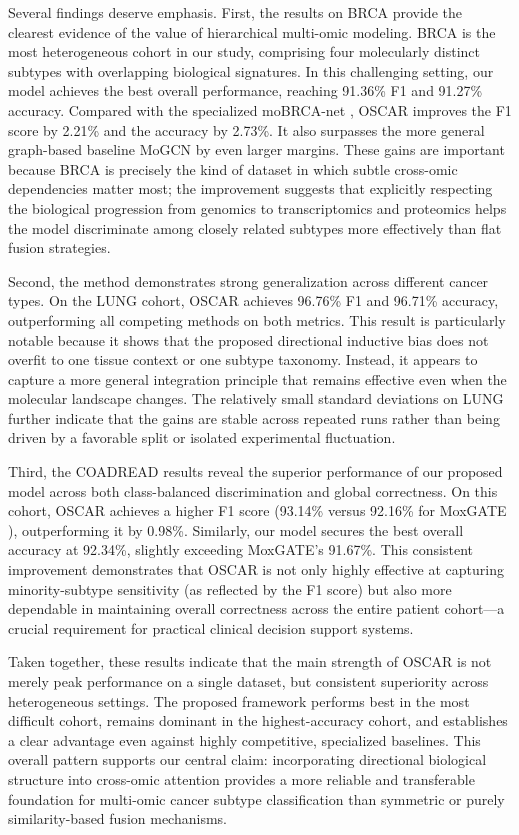 \documentclass[lettersize,journal]{IEEEtran}
\begin{document}
Several findings deserve emphasis. First, the results on BRCA provide the clearest evidence of the value of hierarchical multi-omic modeling. BRCA is the most heterogeneous cohort in our study, comprising four molecularly distinct subtypes with overlapping biological signatures. In this challenging setting, our model achieves the best overall performance, reaching 91.36\% F1 and 91.27\% accuracy. Compared with the specialized moBRCA-net \cite{moBRCAnat2023}, OSCAR improves the F1 score by 2.21\% and the accuracy by 2.73\%. It also surpasses the more general graph-based baseline MoGCN \cite{MoGCN2022} by even larger margins. These gains are important because BRCA is precisely the kind of dataset in which subtle cross-omic dependencies matter most; the improvement suggests that explicitly respecting the biological progression from genomics to transcriptomics and proteomics helps the model discriminate among closely related subtypes more effectively than flat fusion strategies.

Second, the method demonstrates strong generalization across different cancer types. On the LUNG cohort, OSCAR achieves 96.76\% F1 and 96.71\% accuracy, outperforming all competing methods on both metrics. This result is particularly notable because it shows that the proposed directional inductive bias does not overfit to one tissue context or one subtype taxonomy. Instead, it appears to capture a more general integration principle that remains effective even when the molecular landscape changes. The relatively small standard deviations on LUNG further indicate that the gains are stable across repeated runs rather than being driven by a favorable split or isolated experimental fluctuation.

Third, the COADREAD results reveal the superior performance of our proposed model across both class-balanced discrimination and global correctness. On this cohort, OSCAR achieves a higher F1 score (93.14\% versus 92.16\% for MoxGATE \cite{MoxGATE2023}), outperforming it by 0.98\%. Similarly, our model secures the best overall accuracy at 92.34\%, slightly exceeding MoxGATE's 91.67\%. This consistent improvement demonstrates that OSCAR is not only highly effective at capturing minority-subtype sensitivity (as reflected by the F1 score) but also more dependable in maintaining overall correctness across the entire patient cohort—a crucial requirement for practical clinical decision support systems.

Taken together, these results indicate that the main strength of OSCAR is not merely peak performance on a single dataset, but consistent superiority across heterogeneous settings. The proposed framework performs best in the most difficult cohort, remains dominant in the highest-accuracy cohort, and establishes a clear advantage even against highly competitive, specialized baselines. This overall pattern supports our central claim: incorporating directional biological structure into cross-omic attention provides a more reliable and transferable foundation for multi-omic cancer subtype classification than symmetric or purely similarity-based fusion mechanisms.
\end{document}
